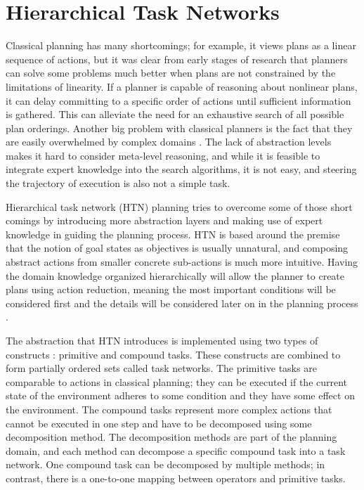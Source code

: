 \section{Hierarchical Task Networks}
\label{sec:HTNPlanning}
Classical planning has many shortcomings; for example, 
it views plans as a linear sequence of actions, but it was clear from early stages of research\cite{NonlinearNaturePlanssacerdoti1975} that planners can solve some problems much better when plans are not constrained by the limitations of linearity. If a planner is capable of reasoning about nonlinear plans, it can delay committing to a specific order of actions until sufficient information is gathered. This can alleviate the need for an exhaustive search of all possible plan orderings. Another big problem with classical planners is the fact that they are easily overwhelmed by complex domains \cite{PracticalPlanningExtendingwilkins1989}. The lack of abstraction levels makes it hard to consider meta-level reasoning, and while it is feasible to integrate expert knowledge into the search algorithms, it is not easy, and steering the trajectory of execution is also not a simple task.

Hierarchical task network (HTN) planning tries to overcome some of those short comings by introducing more abstraction layers and making use of expert knowledge in guiding the planning process. HTN is based around the premise that the notion of goal states as objectives is usually unnatural, and composing abstract actions from smaller concrete sub-actions is much more intuitive. Having the domain knowledge organized hierarchically will allow the planner to create plans using action reduction, meaning the most important conditions will be considered first and the details will be considered later on in the planning process \cite{FormalizingPlanningKnowledgeyang1990}.

The abstraction that HTN introduces is implemented using two types of constructs \cite{PANDAFrameworkHierarchicalholler2021}: primitive and compound tasks. These constructs are combined to form partially ordered sets called task networks. The primitive tasks are comparable to actions in classical planning; they can be executed if the current state of the environment adheres to some condition and they have some effect on the environment. The compound tasks represent more complex actions that cannot be executed in one step and have to be decomposed using some decomposition method. The decomposition methods are part of the planning domain, and each method can decompose a specific compound task into a task network. One compound task can be decomposed by multiple methods; in contrast, there is a one-to-one mapping between operators and primitive tasks.

